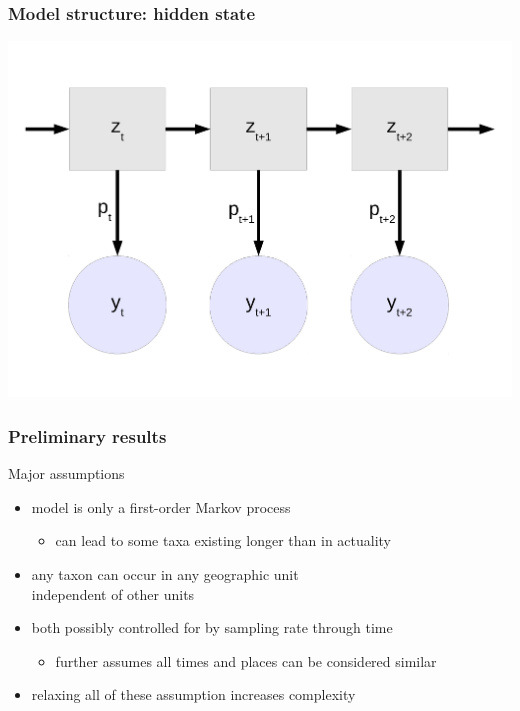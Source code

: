 \documentclass{beamer}
\begin{document}
\begin{frame}
  \frametitle{Model structure: hidden state}
  \begin{center}
    \includegraphics[width=\textwidth,height=0.8\textheight,keepaspectratio=true]{figure/hidden_state}
  \end{center}
\end{frame}


\begin{frame}
  \frametitle{Preliminary results}
\end{frame}

\begin{frame}
  \begin{block}{Major assumptions}
    \begin{itemize}
      \item model is only a first-order Markov process
        \begin{itemize}
          \item can lead to some taxa existing longer than in actuality
        \end{itemize}
      \item any taxon can occur in any geographic unit \\independent of other units
      \item both possibly controlled for by sampling rate through time
        \begin{itemize}
          \item further assumes all times and places can be considered similar
        \end{itemize}
      \item relaxing all of these assumption increases complexity
    \end{itemize}
  \end{block}
\end{frame}
\end{document}
